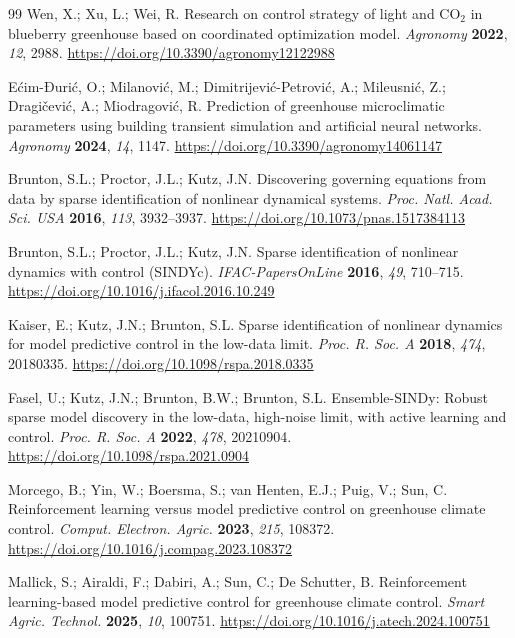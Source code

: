 \begin{thebibliography}{99}
Wen, X.; Xu, L.; Wei, R. Research on control strategy of light and CO$_2$ in blueberry
greenhouse based on coordinated optimization model. \textit{Agronomy} \textbf{2022},
\textit{12}, 2988. \url{https://doi.org/10.3390/agronomy12122988}

E{\'c}im-Đuri{\'c}, O.; Milanovi{\'c}, M.; Dimitrijevi{\'c}-Petrovi{\'c}, A.;
Mileusni{\'c}, Z.; Dragi{\v{c}}evi{\'c}, A.; Miodragovi{\'c}, R. Prediction of greenhouse
microclimatic parameters using building transient simulation and artificial neural networks.
\textit{Agronomy} \textbf{2024}, \textit{14}, 1147.
\url{https://doi.org/10.3390/agronomy14061147}

Brunton, S.L.; Proctor, J.L.; Kutz, J.N. Discovering governing equations from data by sparse
identification of nonlinear dynamical systems. \textit{Proc. Natl. Acad. Sci. USA}
\textbf{2016}, \textit{113}, 3932--3937. \url{https://doi.org/10.1073/pnas.1517384113}

Brunton, S.L.; Proctor, J.L.; Kutz, J.N. Sparse identification of nonlinear dynamics with
control (SINDYc). \textit{IFAC-PapersOnLine} \textbf{2016}, \textit{49}, 710--715.
\url{https://doi.org/10.1016/j.ifacol.2016.10.249}

Kaiser, E.; Kutz, J.N.; Brunton, S.L. Sparse identification of nonlinear dynamics for model
predictive control in the low-data limit. \textit{Proc. R. Soc. A} \textbf{2018},
\textit{474}, 20180335. \url{https://doi.org/10.1098/rspa.2018.0335}

Fasel, U.; Kutz, J.N.; Brunton, B.W.; Brunton, S.L. Ensemble-SINDy: Robust sparse model
discovery in the low-data, high-noise limit, with active learning and control.
\textit{Proc. R. Soc. A} \textbf{2022}, \textit{478}, 20210904.
\url{https://doi.org/10.1098/rspa.2021.0904}

Morcego, B.; Yin, W.; Boersma, S.; van Henten, E.J.; Puig, V.; Sun, C. Reinforcement learning
versus model predictive control on greenhouse climate control. \textit{Comput. Electron.
Agric.} \textbf{2023}, \textit{215}, 108372.
\url{https://doi.org/10.1016/j.compag.2023.108372}

Mallick, S.; Airaldi, F.; Dabiri, A.; Sun, C.; De Schutter, B. Reinforcement learning-based
model predictive control for greenhouse climate control. \textit{Smart Agric. Technol.}
\textbf{2025}, \textit{10}, 100751. \url{https://doi.org/10.1016/j.atech.2024.100751}


\end{thebibliography}
